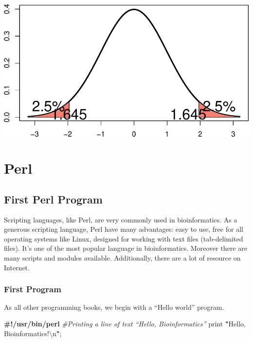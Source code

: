 \documentclass[]{book}
\makeatletter
\newenvironment{Shaded}{\begin{snugshade}}{\end{snugshade}}
\newcommand{\CharTok}[1]{\textcolor[rgb]{0.31,0.60,0.02}{#1}}
\newcommand{\CommentTok}[1]{\textcolor[rgb]{0.56,0.35,0.01}{\textit{#1}}}
\newcommand{\FunctionTok}[1]{\textcolor[rgb]{0.00,0.00,0.00}{#1}}
\newcommand{\KeywordTok}[1]{\textcolor[rgb]{0.13,0.29,0.53}{\textbf{#1}}}
\newcommand{\NormalTok}[1]{#1}
\newcommand{\StringTok}[1]{\textcolor[rgb]{0.31,0.60,0.02}{#1}}
\newenvironment{kframe}{%
\medskip{}
\setlength{\fboxsep}{.8em}
 \def\at@end@of@kframe{}%
 \ifinner\ifhmode%
  \def\at@end@of@kframe{\end{minipage}}%
  \begin{minipage}{\columnwidth}%
 \fi\fi%
 \def\FrameCommand##1{\hskip\@totalleftmargin \hskip-\fboxsep
 \colorbox{shadecolor}{##1}\hskip-\fboxsep
     \hskip-\linewidth \hskip-\@totalleftmargin \hskip\columnwidth}%
 \MakeFramed {\advance\hsize-\width
   \@totalleftmargin\z@ \linewidth\hsize
   \@setminipage}}%
 {\par\unskip\endMakeFramed%
 \at@end@of@kframe}
\renewenvironment{Shaded}{\begin{kframe}}{\end{kframe}}
\makeatother
\begin{document}
\includegraphics{bioinfBookXIE186_files/figure-latex/unnamed-chunk-41-1.pdf}

\hypertarget{part-perl}{%
\part{Perl}\label{part-perl}}

\hypertarget{first-perl-program}{%
\chapter{First Perl Program}\label{first-perl-program}}

Scripting languages, like Perl, are very commonly used in bioinformatics. As a generous scripting language, Perl have many advantages: easy to use, free for all operating systems like Linux, designed for working with text files (tab-delimited files). It's one of the most popular language in bioinformatics. Moreover there are many scripts and modules available. Additionally, there are a lot of resource on Internet.

\hypertarget{first-program}{%
\section{First Program}\label{first-program}}

As all other programming books, we begin with a ``Hello world'' program.

\begin{Shaded}
\begin{Highlighting}[]
\KeywordTok{#!/usr/bin/perl}
\CommentTok{#Printing a line of text “Hello, Bioinformatics”}
\FunctionTok{print} \KeywordTok{"}\StringTok{Hello, Bioinformatics!}\CharTok{\textbackslash{}n}\KeywordTok{"}\NormalTok{;}
\end{Highlighting}
\end{Shaded}
\end{document}

